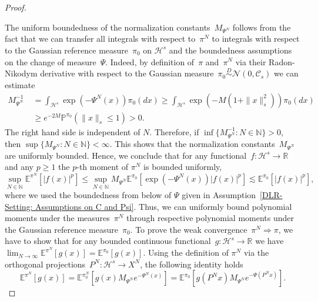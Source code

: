 \begin{proof}\autocite[Lemma 3.5, Lemma 4.3]{Mattingly2010, Pillai2012}
  
 The uniform boundedness of the normalization constants~$M_{\Psi^N}$ follows from the fact that we can transfer all integrals with respect to~$\pi^N$ to integrals with respect to the Gaussian reference measure~$\pi_0$ on $\mathcal{H}^s$ and the boundedness assumptions on the change of measure~$\Psi$. Indeed, by definition of~$\pi$ and~$\pi^N$ via their Radon-Nikodym derivative with respect to the Gaussian measure~$\pi_0 \stackrel{D}{\sim} \mathcal{N}(0, \mathcal{C}_s)$ we can estimate
 \begin{equation*}
   \begin{split}
   M_{\Psi^N}^{-1} & \; = \int_{\mathcal{H}^s} \exp (-\Psi^N(x)) \pi_0(dx) \geq \int_{\mathcal{H}^s} \exp (-M(1+ \|x\|_s^2)) \pi_0(dx) \\
   & \; \geq e^{-2M} \mathbb{P}^{\pi_0}(\|x\|_s \leq 1) > 0.
   \end{split}
 \end{equation*}
 The right hand side is independent of $N$. Therefore, if $\inf \{ M_{\Psi^N}^{-1}: N \in \mathbb{N}\} > 0$, then $ \sup\{ M_{\Psi^N}: N \in \mathbb{N}\} < \infty$. This shows that the normalization constants~$M_{\Psi^N}$ are uniformly bounded. Hence, we conclude that for any functional~$f: \mathcal{H}^s \to \mathbb{R}$ and any $p\geq 1$ the $p$-th moment of $\pi^N$ is bounded uniformly,
 \begin{equation*}
  \sup_{N \in \mathbb{N}} \mathbb{E}^{\pi^N} [| f(x) |^p] \leq \sup_{N \in \mathbb{N}} M_{\Psi^N} \mathbb{E}^{\pi_0}[ \exp (-\Psi^N(x)) |f(x)|^p] \lesssim \mathbb{E}^{\pi_0}[|f(x)|^p],
 \end{equation*}
 where we used the boundedness from below of $\Psi$ given in Assumption~\ref{DLR-Setting: Assumptions on C and Psi}. Thus, we can uniformly bound polynomial moments under the measures~$\pi^N$ through respective polynomial moments under the Gaussian reference measure~$\pi_0$. To prove the weak convergence~$\pi^N \Longrightarrow \pi$, we have to show that for any bounded continuous functional~$g: \mathcal{H}^s \to \mathbb{R}$ we have $\lim_{N \to \infty} \mathbb{E}^{\pi^N} [ g(x) ] = \mathbb{E}^{\pi_0}[g(x)]$. Using the definition of $\pi^N$ via the orthogonal projections~$P^N: \mathcal{H}^s \to X^N$, the following identity holds
 \begin{equation*}
   \mathbb{E}^{\pi^N} [g(x)] = \mathbb{E}^{\pi^N_0} [g(x)M_{\Psi^N} e^{-\Psi^N(x)} ] =  \mathbb{E}^{\pi_0}[ g(P^Nx) M_{\Psi^N} e^{-\Psi(P^Nx)} ].

\end{equation*}
\end{proof}
